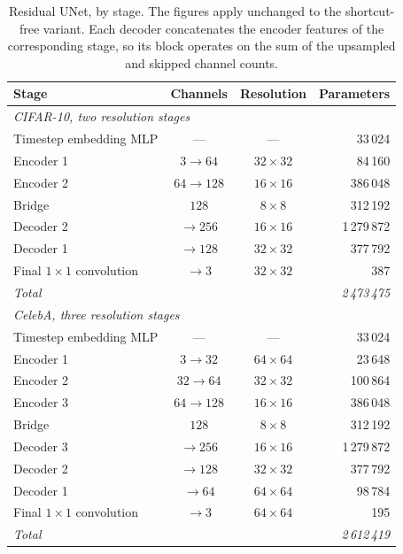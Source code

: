 \begin{table}[htbp]
    \centering
    \caption{Residual UNet, by stage. The figures apply unchanged to the shortcut-free variant.
    Each decoder concatenates the encoder features of the corresponding stage, so its block operates
    on the sum of the upsampled and skipped channel counts.}
    \label{tab:spec-resunet}
    \small
    \begin{tabular}{lccr}
        \toprule
        Stage & Channels & Resolution & Parameters \\
        \midrule
        \multicolumn{4}{l}{\emph{CIFAR-10, two resolution stages}} \\
        Timestep embedding MLP & --- & --- & 33\,024 \\
        Encoder 1 & $3 \rightarrow 64$ & $32 \times 32$ & 84\,160 \\
        Encoder 2 & $64 \rightarrow 128$ & $16 \times 16$ & 386\,048 \\
        Bridge & $128$ & $8 \times 8$ & 312\,192 \\
        Decoder 2 & $\rightarrow 256$ & $16 \times 16$ & 1\,279\,872 \\
        Decoder 1 & $\rightarrow 128$ & $32 \times 32$ & 377\,792 \\
        Final $1 \times 1$ convolution & $\rightarrow 3$ & $32 \times 32$ & 387 \\
        \emph{Total} & & & \emph{2\,473\,475} \\
        \midrule
        \multicolumn{4}{l}{\emph{CelebA, three resolution stages}} \\
        Timestep embedding MLP & --- & --- & 33\,024 \\
        Encoder 1 & $3 \rightarrow 32$ & $64 \times 64$ & 23\,648 \\
        Encoder 2 & $32 \rightarrow 64$ & $32 \times 32$ & 100\,864 \\
        Encoder 3 & $64 \rightarrow 128$ & $16 \times 16$ & 386\,048 \\
        Bridge & $128$ & $8 \times 8$ & 312\,192 \\
        Decoder 3 & $\rightarrow 256$ & $16 \times 16$ & 1\,279\,872 \\
        Decoder 2 & $\rightarrow 128$ & $32 \times 32$ & 377\,792 \\
        Decoder 1 & $\rightarrow 64$ & $64 \times 64$ & 98\,784 \\
        Final $1 \times 1$ convolution & $\rightarrow 3$ & $64 \times 64$ & 195 \\
        \emph{Total} & & & \emph{2\,612\,419} \\
        \bottomrule
    \end{tabular}
\end{table}

